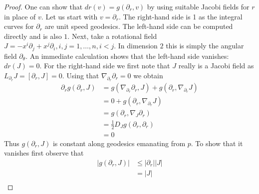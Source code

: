 \begin{proof}
	One can show that \( d r ( v ) = g \left( \partial _ { r } , v \right) \) by using suitable Jacobi fields for \( r \) in place of \( v \). Let us start with \( v = \partial _ { r } . \)
	The right-hand side is 1 as the integral curves for \( \partial _ { r } \) are unit speed geodesics.
	The left-hand side can be computed directly and is also $1$.
	Next, take a rotational field \( J = - x ^ { i } \partial _ { j } + x ^ { j } \partial _ { i } , i , j = 1 , \ldots , n , i < j . \)
	In dimension $2$ this is simply the angular field \( \partial _ { \theta } \).
	An immediate calculation shows that the left-hand side vanishes: \( d r ( J ) = 0 \).
	For the right-hand side we first note that \( J \) really is a Jacobi field as \( L _ { \partial _ { r } } J = \left[ \partial _ { r } , J \right] = 0 . \)
	Using that \( \nabla _ { \partial _ { r } } \partial _ { r } = 0 \) we obtain
	\[ \begin{aligned}
			\partial _ { r } g \left( \partial _ { r } , J \right) & = g \left( \nabla _ { \partial _ { r } } \partial _ { r } , J \right) + g \left( \partial _ { r } , \nabla _ { \partial _ { r } } J \right) \\
			                                                       & = 0 + g \left( \partial _ { r } , \nabla _ { \partial _ { r } } J \right)                                                                   \\
			                                                       & = g \left( \partial _ { r } , \nabla _ { J } \partial _ { r } \right)                                                                       \\
			                                                       & = \frac { 1 } { 2 } D _ { J } g \left( \partial _ { r } , \partial _ { r } \right)                                                          \\
			                                                       & = 0
		\end{aligned} \]
	Thus \( g \left( \partial _ { r } , J \right) \) is constant along geodesics emanating from \( p \).
	To show that it vanishes first observe that
	\[ \begin{aligned} \left| g \left( \partial _ { r } , J \right) \right| & \leq \left| \partial _ { r } \right| | J |                                                                               \\
                                                                     & = | J |                                                                                                                  \\

\end{aligned}\]
\end{proof}
